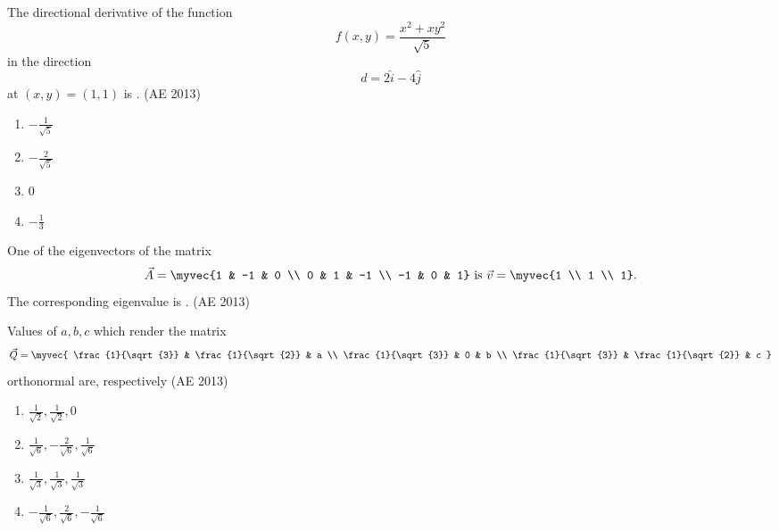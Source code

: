 \item The directional derivative of the function 
\[
f(x,y)=\frac{x^2+xy^2}{\sqrt{5}}
\] 
in the direction 
\[
d=2\hat{i}-4\hat{j}
\] 
at $(x,y)=(1,1)$ is \underline{\hspace{3cm}}.
\hfill(AE 2013)
\begin{multicols}{4}
\begin{enumerate}
    \item $-\frac{1}{\sqrt{5}}$
    \item $-\frac{2}{\sqrt{5}}$
    \item $0$
    \item $-\frac{1}{3}$
\end{enumerate}
\end{multicols}
\item One of the eigenvectors of the matrix
\[
\vec{A} = \myvec{1 & -1 & 0 \\ 0 & 1 & -1 \\ -1 & 0 & 1}
\text{ is } 
\vec{v} = \myvec{1 \\ 1 \\ 1}.
\]
The corresponding eigenvalue is \underline{\hspace{3cm}}.
\hfill(AE 2013)
\item Values of $a, b, c$ which render the matrix
\[
\vec{Q} = \myvec{ \frac{1}{\sqrt{3}} & \frac{1}{\sqrt{2}} & a \\
           \frac{1}{\sqrt{3}} & 0 & b \\
           \frac{1}{\sqrt{3}} & \frac{1}{\sqrt{2}} & c }
\]
orthonormal are, respectively
\hfill(AE 2013)
\begin{multicols}{4}
\begin{enumerate}
    \item $\frac{1}{\sqrt{2}}, \frac{1}{\sqrt{2}}, 0$  
    \item $\frac{1}{\sqrt{6}}, -\frac{2}{\sqrt{6}}, \frac{1}{\sqrt{6}}$  
    \item $\frac{1}{\sqrt{3}}, \frac{1}{\sqrt{3}}, \frac{1}{\sqrt{3}}$  
    \item $-\frac{1}{\sqrt{6}}, \frac{2}{\sqrt{6}}, -\frac{1}{\sqrt{6}}$  
\end{enumerate}
\end{multicols}

